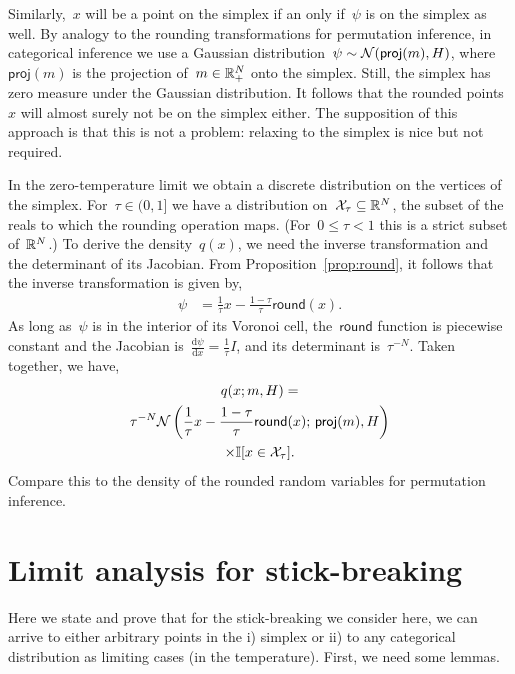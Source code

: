 \documentclass[twoside]{article}
\begin{document}
Similarly,~$x$ will be a point on the simplex if an only if~$\psi$ is
on the simplex as well.  By analogy to the rounding transformations
for permutation inference, in categorical inference we use a Gaussian
distribution~${\psi \sim \mathcal{N}(\mathsf{proj}(m), H)}$,
where~$\mathsf{proj}(m)$ is the projection of~$m \in \mathbb{R}_+^N$ onto
the simplex.  Still, the simplex has zero measure under the Gaussian
distribution.  It follows that the rounded points~$x$ will almost
surely not be on the simplex either.  The supposition of this approach
is that this is not a problem: relaxing to the simplex is nice but not
required.

In the zero-temperature limit we obtain a discrete distribution on the
vertices of the simplex.  For~${\tau \in (0,1]}$ we have a
distribution on~${\mathcal{X}_\tau \subseteq \mathbb{R}^N}$, the subset of the
reals to which the rounding operation maps. (For~${0 \leq \tau < 1}$
this is a strict subset of~$\mathbb{R}^N$.) To derive the
density~$q(x)$, we need the inverse transformation and the
determinant of its Jacobian.  From Proposition~\ref{prop:round}, it
follows that the inverse transformation is given by,
\begin{align*}
  \psi &= \frac{1}{\tau} x - \frac{1 - \tau}{\tau} \mathsf{round}(x).
\end{align*}
As long as~$\psi$ is in the interior of its Voronoi cell,
the~$\mathsf{round}$ function is piecewise constant and the
Jacobian is~${\tfrac{\mathrm{d}\psi}{\mathrm{d}x} = \tfrac{1}{\tau} I}$,
and its determinant is~$\tau^{-N}$. Taken together, we have,
\begin{multline*}
  q(x; m, H) =  \\
  \tau^{-N} \mathcal{N} \left(\frac{1}{\tau}x - \frac{1-\tau}{\tau} \mathsf{round}(x); \, \mathsf{proj}(m), H \right) \\
  \times \mathbb{I}[x \in \mathcal{X}_\tau].
\end{multline*}
Compare this to the density of the rounded random variables for
permutation inference. 

\section{Limit analysis for stick-breaking}

Here we state and prove that for  the stick-breaking we consider here, we can arrive to either arbitrary points in the i) simplex or ii) to any categorical distribution as limiting cases (in the temperature).  First, we need some lemmas.
\end{document}
